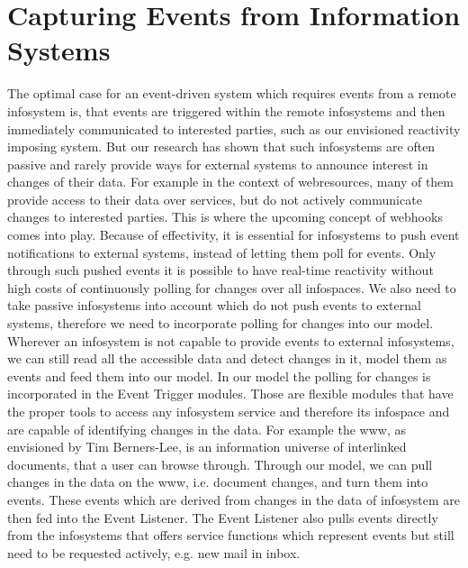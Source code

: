 \section{Capturing Events from Information Systems}
The optimal case for an event-driven system which requires events from a remote \textrm{\gls{infosystem}} is, that events are triggered within the remote \textrm{\glspl{infosystem}} and then immediately communicated to interested parties, such as our envisioned reactivity imposing system.
But our research has shown that such \textrm{\glspl{infosystem}} are often passive and rarely provide ways for external systems to announce interest in changes of their data.
For example in the context of \textrm{\glspl{webresource}}, many of them provide access to their data over services, but do not actively communicate changes to interested parties.
This is where the upcoming concept of \textrm{\glspl{webhook}} comes into play.
Because of effectivity, it is essential for \textrm{\glspl{infosystem}} to push event notifications to external systems, instead of letting them poll for events.
Only through such pushed events it is possible to have real-time reactivity without high costs of continuously polling for changes over all \textrm{\glspl{infospace}}.
We also need to take passive \textrm{\glspl{infosystem}} into account which do not push events to external systems, therefore we need to incorporate polling for changes into our model.
Wherever an \textrm{\gls{infosystem}} is not capable to provide events to external \textrm{\glspl{infosystem}}, we can still read all the accessible data and detect changes in it, model them as events and feed them into our model.
In our model the polling for changes is incorporated in the \textrm{Event Trigger} modules.
Those are flexible modules that have the proper tools to access any \textrm{\gls{infosystem}} service and therefore its \textrm{\gls{infospace}} and are capable of identifying changes in the data.
For example the \textrm{\gls{www}}, as envisioned by Tim Berners-Lee\cite{DBLP:journals/en/Berners-LeeCGP92}, is an information universe of interlinked documents, that a user can browse through.
Through our model, we can pull changes in the data on the \textrm{\gls{www}}, i.e. document changes, and turn them into events.
These events which are derived from changes in the data of \textrm{\gls{infosystem}} are then fed into the \textrm{Event Listener}.
The \textrm{Event Listener} also pulls events directly from the \textrm{\glspl{infosystem}} that offers service functions which represent events but still need to be requested actively, e.g. new mail in inbox.



